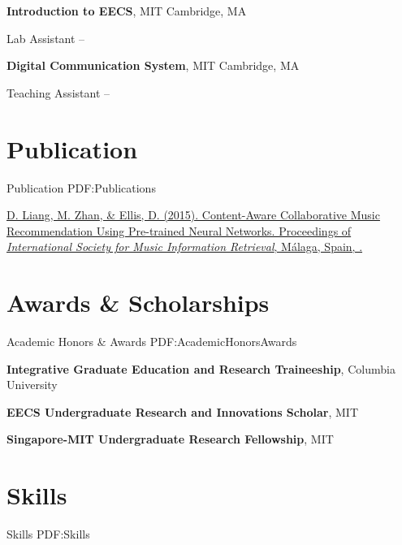 \documentclass[a4paper,10pt,oneside]{article}
\begin{document}
\begin{body}
\textbf{Introduction to EECS},
MIT \hfill Cambridge, MA
\par
Lab Assistant
\hfill
{} --

\EntryGap

\textbf{Digital Communication System},
MIT \hfill Cambridge, MA
\par
Teaching Assistant
\hfill
{} --



\section
{Publication}
{Publication}
{PDF:Publications}

\href{http://ismir2015.uma.es/articles/290_Paper.pdf}
{D. Liang, \underline{M. Zhan}, \& Ellis, D. (2015).
Content-Aware Collaborative Music Recommendation Using Pre-trained Neural Networks. Proceedings of \textit{International Society for Music Information Retrieval},
Málaga, Spain, 
.}


\section
{Awards \& \newline Scholarships}
{Academic Honors \& Awards}
{PDF:AcademicHonorsAwards}

\textbf{Integrative Graduate Education and Research Traineeship}, Columbia University
\hfill
{} 

\SmallEntryGap

\textbf{EECS Undergraduate Research and Innovations Scholar}, MIT
\hfill
{}

\SmallEntryGap

\textbf{Singapore-MIT Undergraduate Research Fellowship}, MIT
\hfill
{}






\section
{Skills}
{Skills}
{PDF:Skills}


\end{body}
\end{document}
